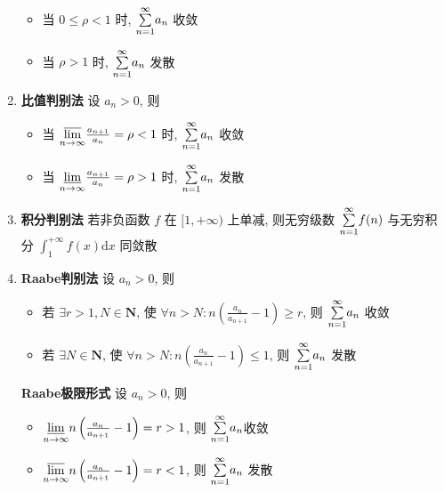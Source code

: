 \documentclass{article}
\begin{document}
\begin{enumerate}
				\begin{itemize}
				\item 当 $0 \leq \rho<1$ 时, $\overunderset{\infty}{n=1}{\sum} a_{n}$ 收敛
				\item 当 $\rho>1$ 时, $\overunderset{\infty}{n=1}{\sum} a_{n}$ 发散
				\end{itemize}
				\item \textbf{比值判别法} 设 $a_{n}>0$, 则
				\begin{itemize}
				\item 当 $\underset{n \rightarrow \infty}{\varlimsup} \frac{a_{n+1}}{a_{n}}=\rho<1$ 时, $\overunderset{\infty}{n=1}{\sum} a_{n}$ 收敛
				\item 当 $\underset{n \rightarrow \infty}{\varliminf} \frac{a_{n+1}}{a_{n}}=\rho>1$ 时, $\overunderset{\infty}{n=1}{\sum} a_{n}$ 发散
				\end{itemize}
				\item \textbf{积分判别法}
				若非负函数 $f$ 在 $[1, +\infty)$ 上单减, 则无穷级数
				$\overunderset{\infty}{n=1}{\sum} f(n)$ 与无穷积分 $\int_{1}^{+\infty} f(x) \mathrm{d} x$ 同敛散
				\item \textbf{Raabe判别法} 设 $a_{n}>0$, 则
				\begin{itemize}
					\item 若 $\exists r>1, N \in \mathbf{N}$, 使 $\forall n>N: n\left(\frac{a_{n}}{a_{n+1}}-1\right) \geq r$, 则 $\overunderset{\infty}{n=1}{\sum} a_{n}$ 收敛
					\item 若 $\exists N \in \mathbf{N}$, 使 $\forall n>N: n\left(\frac{a_{n}}{a_{n+1}}-1\right) \leq 1$, 则 $\overunderset{\infty}{n=1}{\sum} a_{n}$ 发散
					\end{itemize}
				\textbf{Raabe极限形式} 设 $a_{n}>0$, 则
				\begin{itemize}
					\item $\underset{n \rightarrow \infty}{\varliminf } n\left(\frac{a_{n}}{a_{n+1}}-1\right)=r>1$, 则 $\overunderset{\infty}{n=1}{\sum} a_{n} $收敛
					\item $\underset{n \rightarrow \infty}{\varlimsup} n\left(\frac{a_{n}}{a_{n+1}}-1\right)=r<1$, 则 $\overunderset{\infty}{n=1}{\sum} a_{n}$ 发散
				\end{itemize}

\end{enumerate}
\end{document}
